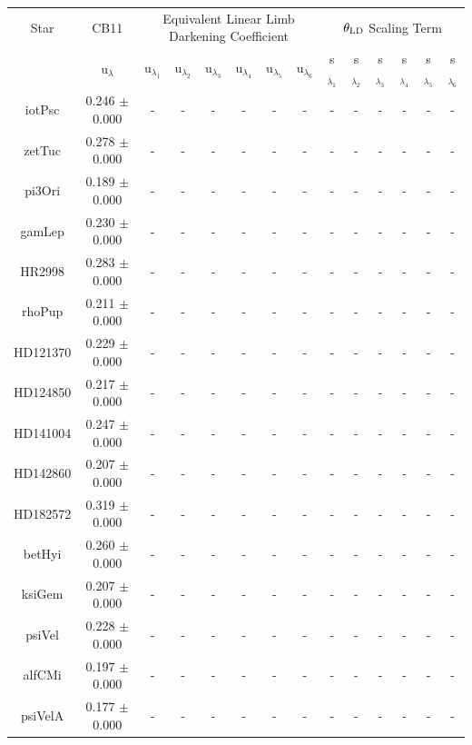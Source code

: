 \begin{tabular}{cccccccccccccc}
\hline
Star & CB11 &\multicolumn{6}{c}{Equivalent Linear Limb Darkening Coefficient} &\multicolumn{6}{c}{$\theta_{\rm LD}$ Scaling Term} \\
 & u$_{\lambda}$ & u$_{\lambda_1}$ & u$_{\lambda_2}$ & u$_{\lambda_3}$ & u$_{\lambda_4}$ & u$_{\lambda_5}$ & u$_{\lambda_6}$ & s$_{\lambda_1}$ & s$_{\lambda_2}$ & s$_{\lambda_3}$ & s$_{\lambda_4}$ & s$_{\lambda_5}$ & s$_{\lambda_6}$ \\
\hline
iotPsc & 0.246 $\pm$ 0.000 & -&-&-&-&-&-&-&-&-&-&-&- \\
zetTuc & 0.278 $\pm$ 0.000 & -&-&-&-&-&-&-&-&-&-&-&- \\
pi3Ori & 0.189 $\pm$ 0.000 & -&-&-&-&-&-&-&-&-&-&-&- \\
gamLep & 0.230 $\pm$ 0.000 & -&-&-&-&-&-&-&-&-&-&-&- \\
HR2998 & 0.283 $\pm$ 0.000 & -&-&-&-&-&-&-&-&-&-&-&- \\
rhoPup & 0.211 $\pm$ 0.000 & -&-&-&-&-&-&-&-&-&-&-&- \\
HD121370 & 0.229 $\pm$ 0.000 & -&-&-&-&-&-&-&-&-&-&-&- \\
HD124850 & 0.217 $\pm$ 0.000 & -&-&-&-&-&-&-&-&-&-&-&- \\
HD141004 & 0.247 $\pm$ 0.000 & -&-&-&-&-&-&-&-&-&-&-&- \\
HD142860 & 0.207 $\pm$ 0.000 & -&-&-&-&-&-&-&-&-&-&-&- \\
HD182572 & 0.319 $\pm$ 0.000 & -&-&-&-&-&-&-&-&-&-&-&- \\
betHyi & 0.260 $\pm$ 0.000 & -&-&-&-&-&-&-&-&-&-&-&- \\
ksiGem & 0.207 $\pm$ 0.000 & -&-&-&-&-&-&-&-&-&-&-&- \\
psiVel & 0.228 $\pm$ 0.000 & -&-&-&-&-&-&-&-&-&-&-&- \\
alfCMi & 0.197 $\pm$ 0.000 & -&-&-&-&-&-&-&-&-&-&-&- \\
psiVelA & 0.177 $\pm$ 0.000 & -&-&-&-&-&-&-&-&-&-&-&- \\
\hline
\end{tabular}
